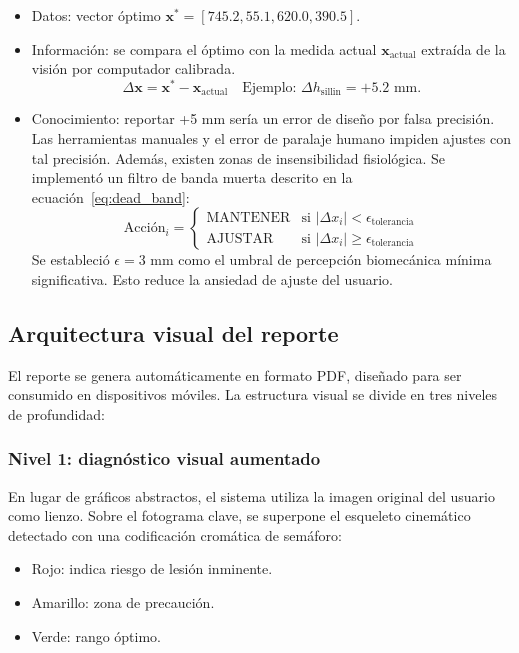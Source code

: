 \begin{itemize}
  \item Datos: vector óptimo $\mathbf{x}^* = [745.2, 55.1, 620.0, 390.5]$.
  \item Información: se compara el óptimo con la medida actual
        $\mathbf{x}_{\text{actual}}$ extraída de la visión por computador calibrada.
        \[ \Delta \mathbf{x} = \mathbf{x}^* - \mathbf{x}_{\text{actual}} \quad \text{Ejemplo: } \Delta h_{\text{sillin}} = +5.2 \text{ mm}. \]
  \item Conocimiento: reportar +5 mm sería un error de diseño por falsa precisión.
        Las herramientas manuales y el error de paralaje humano impiden ajustes con tal
        precisión. Además, existen zonas de insensibilidad fisiológica. Se implementó
        un filtro de banda muerta descrito en la ecuación~\ref{eq:dead_band}:
        \begin{equation}
          \label{eq:dead_band}
          \text{Acción}_i = \begin{cases}
            \text{MANTENER} & \text{si } |\Delta x_i| < \epsilon_{\text{tolerancia}}    \\
            \text{AJUSTAR}  & \text{si } |\Delta x_i| \geq \epsilon_{\text{tolerancia}}
          \end{cases}
        \end{equation}
        Se estableció $\epsilon = 3$ mm como el umbral de percepción biomecánica mínima significativa. Esto reduce la ansiedad de ajuste del usuario.
\end{itemize}

\subsection{Arquitectura visual del reporte}

El reporte se genera automáticamente en formato PDF, diseñado para ser
consumido en dispositivos móviles. La estructura visual se divide en tres
niveles de profundidad:

\subsubsection{Nivel 1: diagnóstico visual aumentado}
En lugar de gráficos abstractos, el sistema utiliza la imagen original del
usuario como lienzo. Sobre el fotograma clave, se superpone el esqueleto
cinemático detectado con una codificación cromática de semáforo:
\begin{itemize}
  \item Rojo: indica riesgo de lesión inminente.
  \item Amarillo: zona de precaución.
  \item Verde: rango óptimo.
\end{itemize}

